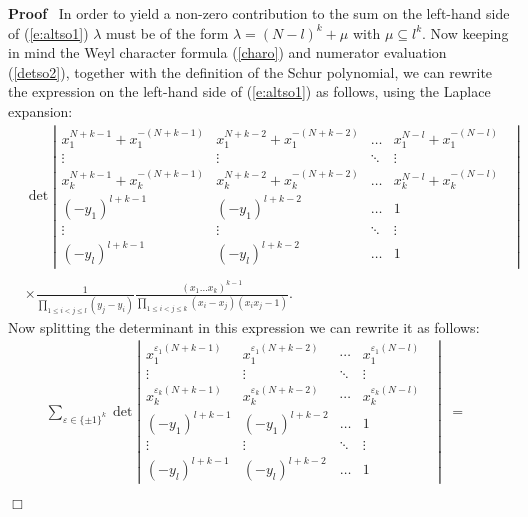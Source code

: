 \documentclass[11pt]{amsart}
\renewenvironment{proof}{
\noindent\textbf{Proof}\ }{\hspace*{\fill}
\begin{math}\Box\end{math}\medskip}
\begin{document}
\begin{proof}
  In order to yield a non-zero contribution to the sum on the left-hand side
  of (\ref{e:altso1}) $\lambda$ must be of the form $\lambda = ( N - l )^k +
  \mu$ with $\mu \subseteq l^k$. Now keeping in mind the Weyl character formula
  (\ref{charo}) and numerator evaluation (\ref{detso2}), together with the
  definition of the Schur polynomial, we can rewrite the expression on the
  left-hand side of (\ref{e:altso1}) as follows, using the Laplace expansion:
  \begin{equation}\label{e:detso2}
\begin{aligned}
& \det \left|
  \begin{array}{ccccc}
  x_1^{N+k-1}+x_1^{-(N+k-1)} &   x_1^{N+k-2}+x_1^{-(N+k-2)}&
\dots &  x_1^{N-l}+x_1^{-(N-l)}& \\
    \vdots & \vdots &\ddots & \vdots & \\
x_k^{N+k-1}+x_k^{-(N+k-1)} &   x_k^{N+k-2}+x_k^{-(N+k-2)}&
\dots &  x_k^{N-l}+x_k^{-(N-l)}& \\
(-y_1)^{l+k-1} &  (-y_1)^{l+k-2}& \dots & 1 &\\
\vdots & \vdots &\ddots & \vdots & \\
(-y_l)^{l+k-1} &  (-y_l)^{l+k-2}& \dots & 1 &
  \end{array} \right|\\
&\\
& \times \frac{1}{\prod_{1\leqslant i<j \leqslant l}(y_j-y_i)}
\frac {(x_1 \dots x_k)^{k-1}}{\prod_{1 \leqslant i<j \leqslant
k}(x_i-x_j)(x_i x_j-1) }.
\end{aligned}
\end{equation}
  Now splitting the determinant in this expression we can rewrite it as
  follows:
  \begin{eqnarray*}
    \sum_{\varepsilon \in \{ \pm 1 \}^k} \det \left| \begin{array}{ccccc}
      x_1^{\varepsilon_1 ( N+k-1 )} & x_1^{\varepsilon_1 ( N+k-2 )} &
      \cdots & x_1^{\varepsilon_1 ( N-l)} & \\
      \vdots & \vdots & \ddots & \vdots & \\
      x_k^{\varepsilon_k ( N+k-1 )} & x_k^{\varepsilon_k ( N+k-2)} &
      \cdots & x_k^{\varepsilon_k ( N-l )} & \\
     (-y_1)^{l+k-1} &  (-y_1)^{l+k-2}& \dots & 1 &\\
\vdots & \vdots &\ddots & \vdots & \\
(-y_l)^{l+k-1} &  (-y_l)^{l+k-2}& \dots & 1 &
    \end{array} \right| & = & \\

\end{eqnarray*}
\end{proof}
\end{document}
